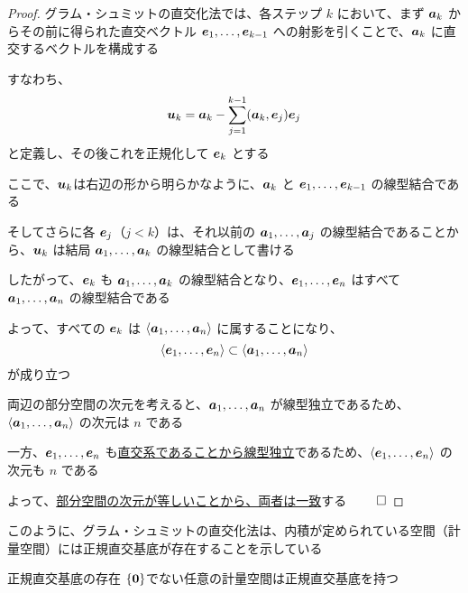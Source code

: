 \documentclass[../../../topic_linear-algebra]{subfiles}
\begin{document}
\begin{proof}
  グラム・シュミットの直交化法では、各ステップ $k$ において、まず $\vb*{a}_k$ からその前に得られた直交ベクトル $\vb*{e}_1, \ldots, \vb*{e}_{k-1}$ への射影を引くことで、$\vb*{a}_k$ に直交するベクトルを構成する

  すなわち、
  \begin{equation*}
    \vb*{u}_k = \vb*{a}_k - \sum_{j=1}^{k-1} (\vb*{a}_k, \vb*{e}_j) \vb*{e}_j
  \end{equation*}
  と定義し、その後これを正規化して $\vb*{e}_k$ とする

  \br

  ここで、$\vb*{u}_k$は右辺の形から明らかなように、$\vb*{a}_k$ と $\vb*{e}_1, \ldots, \vb*{e}_{k-1}$ の線型結合である

  そしてさらに各 $\vb*{e}_j$（$j < k$）は、それ以前の $\vb*{a}_1, \ldots, \vb*{a}_j$ の線型結合であることから、$\vb*{u}_k$ は結局 $\vb*{a}_1, \ldots, \vb*{a}_k$ の線型結合として書ける

  したがって、$\vb*{e}_k$ も $\vb*{a}_1, \ldots, \vb*{a}_k$ の線型結合となり、$\vb*{e}_1, \ldots, \vb*{e}_n$ はすべて $\vb*{a}_1, \ldots, \vb*{a}_n$ の線型結合である

  \br

  よって、すべての $\vb*{e}_k$ は $\langle \vb*{a}_1, \ldots, \vb*{a}_n \rangle$ に属することになり、
  \begin{equation*}
    \langle \vb*{e}_1, \ldots, \vb*{e}_n \rangle \subset \langle \vb*{a}_1, \ldots, \vb*{a}_n \rangle
  \end{equation*}
  が成り立つ

  \br

  両辺の部分空間の次元を考えると、$\vb*{a}_1, \ldots, \vb*{a}_n$ が線型独立であるため、$\langle \vb*{a}_1, \ldots, \vb*{a}_n \rangle$ の次元は $n$ である

  一方、$\vb*{e}_1, \ldots, \vb*{e}_n$ も\hyperref[thm:orthogonal-set-is-independent]{直交系であることから線型独立}であるため、$\langle \vb*{e}_1, \ldots, \vb*{e}_n \rangle$ の次元も $n$ である

  よって、\hyperref[thm:equal-dim-implies-equal-subspace]{部分空間の次元が等しいことから、両者は一致}する $\qed$
\end{proof}

\sectionline

このように、グラム・シュミットの直交化法は、内積が定められている空間（計量空間）には正規直交基底が存在することを示している

\begin{theorem}{正規直交基底の存在}
  $\{\vb*{0}\}$でない任意の計量空間は正規直交基底を持つ
\end{theorem}
\end{document}
